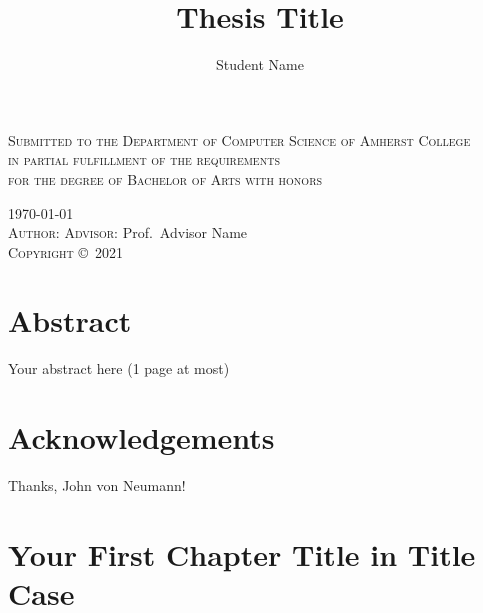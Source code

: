 \documentclass[11pt,twoside,openright]{report}
\author{Student Name}
\title{Thesis Title}
\newcommand{\graduationyear}{2021} %
\newcommand{\advisor}{Advisor Name} %
\begin{document}

\begin{titlepage}
  \centering
  {\LARGE\makeatletter\textbf{\MakeUppercase\@title}\makeatother}\par
  \vspace{0.6\baselineskip}
  {\scshape Submitted to the Department of Computer Science of Amherst
    College\\[0.5\baselineskip]
    in partial fulfillment of the requirements \\[0.5\baselineskip]
    for the degree of Bachelor of Arts with honors
  }\par
  \vspace{0.6\baselineskip}
  \textsc{\today}\\[1in] %
  \vspace{8\baselineskip}
  {\textsc{Author:} \makeatletter\@author\makeatother%
  \hfill\textsc{Advisor:} Prof.\ \advisor}\\[0.6\baselineskip]
  \vfill
  \textsc{Copyright} \copyright\ \textsc{\graduationyear}\ %
  {\scshape \makeatletter\@author\makeatother}
\end{titlepage}


\chapter*{Abstract} %

Your abstract here (1 page at most)

\chapter*{Acknowledgements} %

Thanks, John von Neumann!

\tableofcontents %

\doublespacing%

\chapter{Your First Chapter Title in Title Case}

\lipsum%


\end{document}
